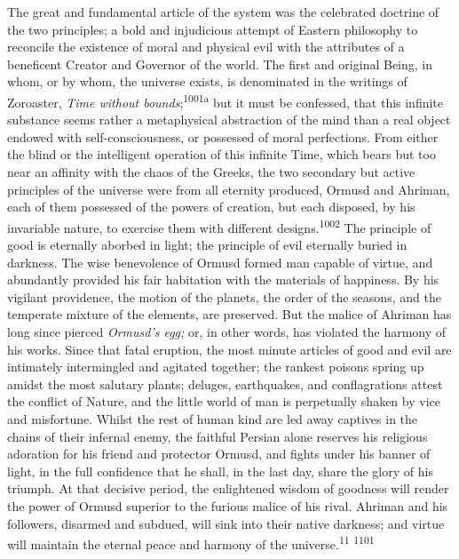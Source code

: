 The great and fundamental article of the system was the
celebrated doctrine of the two principles; a bold and injudicious
attempt of Eastern philosophy to reconcile the existence of moral
and physical evil with the attributes of a beneficent Creator and
Governor of the world. The first and original Being, in whom, or
by whom, the universe exists, is denominated in the writings of
Zoroaster, \textit{Time without bounds};\textsuperscript{1001a} but it must be confessed,
that this infinite substance seems rather a metaphysical
abstraction of the mind than a real object endowed with
self-consciousness, or possessed of moral perfections. From
either the blind or the intelligent operation of this infinite
Time, which bears but too near an affinity with the chaos of the
Greeks, the two secondary but active principles of the universe
were from all eternity produced, Ormusd and Ahriman, each of them
possessed of the powers of creation, but each disposed, by his
invariable nature, to exercise them with different designs.\textsuperscript{1002}
The principle of good is eternally aborbed in light; the
principle of evil eternally buried in darkness. The wise
benevolence of Ormusd formed man capable of virtue, and
abundantly provided his fair habitation with the materials of
happiness. By his vigilant providence, the motion of the planets,
the order of the seasons, and the temperate mixture of the
elements, are preserved. But the malice of Ahriman has long since
pierced \textit{Ormusd’s egg;} or, in other words, has violated the
harmony of his works. Since that fatal eruption, the most minute
articles of good and evil are intimately intermingled and
agitated together; the rankest poisons spring up amidst the most
salutary plants; deluges, earthquakes, and conflagrations attest
the conflict of Nature, and the little world of man is
perpetually shaken by vice and misfortune. Whilst the rest of
human kind are led away captives in the chains of their infernal
enemy, the faithful Persian alone reserves his religious
adoration for his friend and protector Ormusd, and fights under
his banner of light, in the full confidence that he shall, in the
last day, share the glory of his triumph. At that decisive
period, the enlightened wisdom of goodness will render the power
of Ormusd superior to the furious malice of his rival. Ahriman
and his followers, disarmed and subdued, will sink into their
native darkness; and virtue will maintain the eternal peace and
harmony of the universe.\textsuperscript{11} \textsuperscript{1101}


